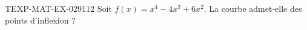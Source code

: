 \begin{exercice}{TEXP-MAT-EX-029}{1}{12}
Soit $f(x) = x^4 - 4x^3 + 6x^2$. La courbe admet-elle des points d'inflexion ?

\end{exercice}
